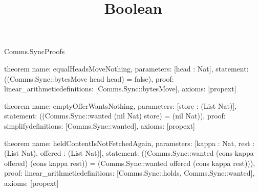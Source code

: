 \begin{lexlean}{Comms.SyncProofs}
\title{Boolean}
\begin{semanticmodule}
theorem{
  name: equalHeadsMoveNothing,
  parameters: [head : Nat],
  statement: ((Comms.Sync::bytesMove head head) = false),
  proof: linear_arithmetic{definitions: [Comms.Sync::bytesMove]},
  axioms: [propext]
}

theorem{
  name: emptyOfferWantsNothing,
  parameters: [store : (List Nat)],
  statement: ((Comms.Sync::wanted (nil Nat) store) = (nil Nat)),
  proof: simplify{definitions: [Comms.Sync::wanted]},
  axioms: [propext]
}

theorem{
  name: heldContentIsNotFetchedAgain,
  parameters: [kappa : Nat, rest : (List Nat), offered : (List Nat)],
  statement: ((Comms.Sync::wanted (cons kappa offered) (cons kappa rest)) = (Comms.Sync::wanted offered (cons kappa rest))),
  proof: linear_arithmetic{definitions: [Comms.Sync::holds, Comms.Sync::wanted]},
  axioms: [propext]
}
\end{semanticmodule}
\end{lexlean}

